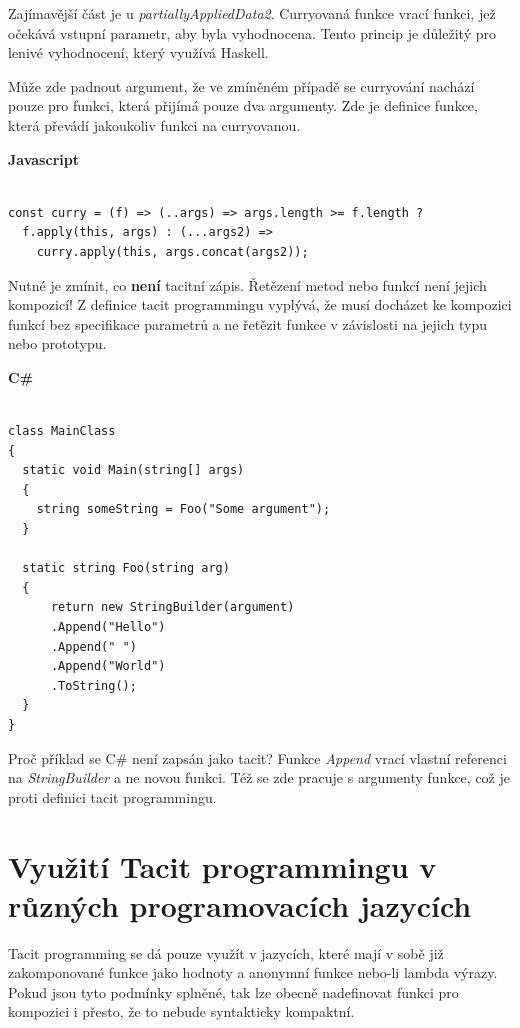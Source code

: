 \documentclass[male,czech]{kithesis}
\begin{document}
Zajímavější část je u \textit{partiallyAppliedData2}. 
Curryovaná funkce vrací funkci, 
jež očekává vstupní parametr, 
aby byla vyhodnocena. 
Tento princip je důležitý
pro lenivé vyhodnocení, 
který využívá Haskell.

Může zde padnout argument, 
že ve zmíněném případě se curryování nachází pouze pro funkci,
která přijímá pouze dva argumenty. 
Zde je definice funkce, 
která převádí jakoukoliv funkci na curryovanou.

\textbf{Javascript}
\begin{verbatim}

const curry = (f) => (..args) => args.length >= f.length ? 
  f.apply(this, args) : (...args2) => 
    curry.apply(this, args.concat(args2));

\end{verbatim}

Nutné je zmínit, 
co \textbf{není} tacitní zápis. 
Řetězení metod nebo funkcí není jejich kompozicí!
Z definice tacit programmingu vyplývá,
že musí docházet ke kompozici funkcí bez specifikace parametrů a
ne řetězit funkce v závislosti na jejich typu nebo prototypu.

\textbf{C\#}
\begin{verbatim}

class MainClass 
{
  static void Main(string[] args)
  {
    string someString = Foo("Some argument");
  }

  static string Foo(string arg)
  {
      return new StringBuilder(argument)
      .Append("Hello")
      .Append(" ")
      .Append("World")
      .ToString();
  }
}

\end{verbatim}

Proč příklad se C\# není zapsán jako tacit? 
Funkce \textit{Append} vrací vlastní referenci na \textit{StringBuilder} a 
ne novou funkci. 
Též se zde pracuje s argumenty funkce, 
což je proti definici tacit programmingu.

\section{Využití Tacit programmingu v různých programovacích jazycích}

Tacit programming se dá pouze využít v jazycích,
které mají v sobě již zakomponované funkce jako hodnoty a
anonymní funkce nebo-li lambda výrazy.
Pokud jsou tyto podmínky splněné, 
tak lze obecně nadefinovat funkci pro kompozici i přesto,
že to nebude syntakticky kompaktní.
\end{document}
